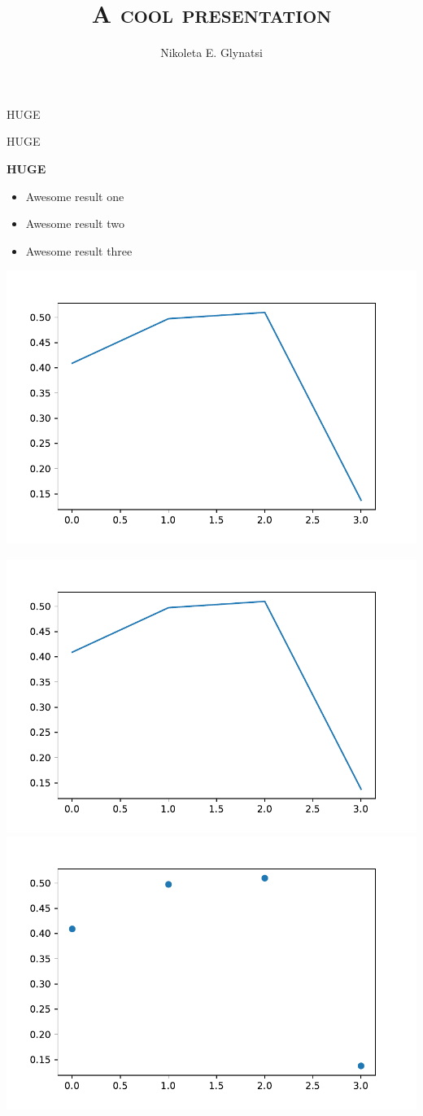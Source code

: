 \documentclass{beamer}
\title{\textsc{A cool presentation}}
\author{Nikoleta E. Glynatsi}
\date{}
\begin{document}
    \maketitle

    \begin{frame}
        \centering
        \Huge HUGE
    \end{frame}

    \begin{frame}
        \centering
        \Huge \textcolor{solarizedRed}{HUGE}
    \end{frame}

    \begin{frame}
        \centering
        \Huge \textbf{HUGE}
    \end{frame}

    \begin{frame}
        \centering
        \begin{itemize}
            \item Awesome result one
            \item Awesome result two
            \item Awesome result three
        \end{itemize}
    \end{frame}

    \begin{frame}
        \centering
        \includegraphics[width=.7\textwidth]{lineplot.pdf}
    \end{frame}

    \begin{frame}
        \centering
        \includegraphics[width=.45\textwidth]{lineplot.pdf} 
        \includegraphics[width=.45\textwidth]{scatter.pdf}
    \end{frame}
\end{document}
